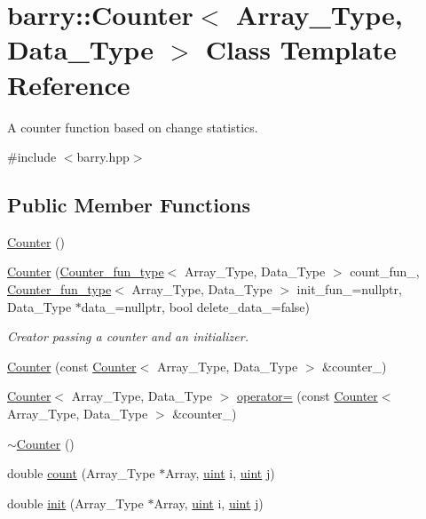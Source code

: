 \hypertarget{classbarry_1_1_counter}{}\section{barry\+:\+:Counter$<$ Array\+\_\+\+Type, Data\+\_\+\+Type $>$ Class Template Reference}
\label{classbarry_1_1_counter}


A counter function based on change statistics.  




{\ttfamily \#include $<$barry.\+hpp$>$}

\subsection*{Public Member Functions}
\begin{DoxyCompactItemize}
\item 
\hyperlink{classbarry_1_1_counter_a3c990d6dbcdc553b3179c8353497a7df}{Counter} ()
\item 
\hyperlink{classbarry_1_1_counter_a1e886197c8f42b2552ada2786726fa38}{Counter} (\hyperlink{namespacebarry_abaaae3200da8e4b7faac3c04fe9c3081}{Counter\+\_\+fun\+\_\+type}$<$ Array\+\_\+\+Type, Data\+\_\+\+Type $>$ count\+\_\+fun\+\_\+, \hyperlink{namespacebarry_abaaae3200da8e4b7faac3c04fe9c3081}{Counter\+\_\+fun\+\_\+type}$<$ Array\+\_\+\+Type, Data\+\_\+\+Type $>$ init\+\_\+fun\+\_\+=nullptr, Data\+\_\+\+Type $\ast$data\+\_\+=nullptr, bool delete\+\_\+data\+\_\+=false)
\begin{DoxyCompactList}\small\item\em Creator passing a counter and an initializer. \end{DoxyCompactList}\item 
\hyperlink{classbarry_1_1_counter_a89aa39dd007b8aa1bcde97519d516806}{Counter} (const \hyperlink{classbarry_1_1_counter}{Counter}$<$ Array\+\_\+\+Type, Data\+\_\+\+Type $>$ \&counter\+\_\+)
\item 
\hyperlink{classbarry_1_1_counter}{Counter}$<$ Array\+\_\+\+Type, Data\+\_\+\+Type $>$ \hyperlink{classbarry_1_1_counter_a058b8f695d6b6493c5d03aee8c01a86c}{operator=} (const \hyperlink{classbarry_1_1_counter}{Counter}$<$ Array\+\_\+\+Type, Data\+\_\+\+Type $>$ \&counter\+\_\+)
\item 
\hyperlink{classbarry_1_1_counter_ad899c3d55bb15e76ed7df05006e88b38}{$\sim$\+Counter} ()
\item 
double \hyperlink{classbarry_1_1_counter_afe1d23e72c3bdca9b2481f36ebde1d95}{count} (Array\+\_\+\+Type $\ast$Array, \hyperlink{namespacebarry_a11dfc53ddb4672278319aa04f1e09a6c}{uint} i, \hyperlink{namespacebarry_a11dfc53ddb4672278319aa04f1e09a6c}{uint} j)
\item 
double \hyperlink{classbarry_1_1_counter_ae0451979ddc51a5fbf00de78c37d3216}{init} (Array\+\_\+\+Type $\ast$Array, \hyperlink{namespacebarry_a11dfc53ddb4672278319aa04f1e09a6c}{uint} i, \hyperlink{namespacebarry_a11dfc53ddb4672278319aa04f1e09a6c}{uint} j)
\end{DoxyCompactItemize}
